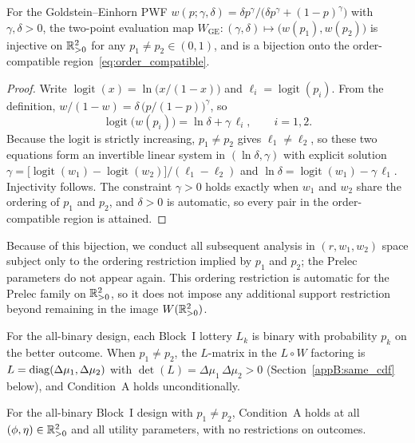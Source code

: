 \begin{lemma}
\label{lem:ge_two_point}
For the Goldstein--Einhorn PWF
$w(p; \gamma, \delta) = \delta p^{\gamma}/\big(\delta p^{\gamma} +
(1-p)^{\gamma}\big)$ with $\gamma, \delta > 0$, the two-point
evaluation map $W_{\mathrm{GE}}\colon (\gamma, \delta) \mapsto
\big(w(p_1), w(p_2)\big)$ is injective on $\mathbb{R}^2_{>0}$ for any
$p_1 \neq p_2 \in (0,1)$, and is a bijection onto the order-compatible
region~\eqref{eq:order_compatible}.
\end{lemma}

\begin{proof}
Write $\operatorname{logit}(x) = \ln\big(x/(1-x)\big)$ and
$\ell_i = \operatorname{logit}(p_i)$. From the definition,
$w/(1-w) = \delta\, \big(p/(1-p)\big)^{\gamma}$, so
\begin{equation}
  \operatorname{logit}\big(w(p_i)\big) = \ln \delta + \gamma\, \ell_i,
  \qquad i = 1, 2.
\end{equation}
Because the logit is strictly increasing, $p_1 \neq p_2$ gives
$\ell_1 \neq \ell_2$, so these two equations form an invertible linear
system in $(\ln \delta, \gamma)$ with explicit solution
$\gamma = \big[\operatorname{logit}(w_1) -
\operatorname{logit}(w_2)\big]/(\ell_1 - \ell_2)$ and
$\ln \delta = \operatorname{logit}(w_1) - \gamma\, \ell_1$. Injectivity
follows. The constraint $\gamma > 0$ holds exactly when $w_1$ and
$w_2$ share the ordering of $p_1$ and $p_2$, and $\delta > 0$ is
automatic, so every pair in the order-compatible region is attained.
\end{proof}

Because of this bijection,
we conduct all subsequent analysis in $(r, w_1, w_2)$ space subject
only to the ordering restriction implied by $p_1$ and $p_2$; the
Prelec parameters do not appear again. This ordering restriction is automatic
for the Prelec family on $\mathbb{R}^2_{>0}$, so it does not impose any additional
support restriction beyond remaining in the image $W(\mathbb{R}^2_{>0})$.

For the all-binary design, each Block~I lottery $L_k$ is binary with
probability $p_k$ on the better outcome. When $p_1 \neq p_2$,
the $L$-matrix in the $L \circ W$ factoring is
$L = \operatorname{diag}(\Delta\mu_1, \Delta\mu_2)$ with
$\det(L) = \Delta\mu_1\,\Delta\mu_2 > 0$
(Section~\ref{appB:same_cdf} below), and Condition~A holds
unconditionally.

\begin{proposition}
\label{prop:binary}
For the all-binary Block~I design with $p_1 \neq p_2$,
Condition~A holds at all $(\phi, \eta) \in \mathbb{R}^2_{>0}$ and all
utility parameters, with no restrictions on outcomes.
\end{proposition}


